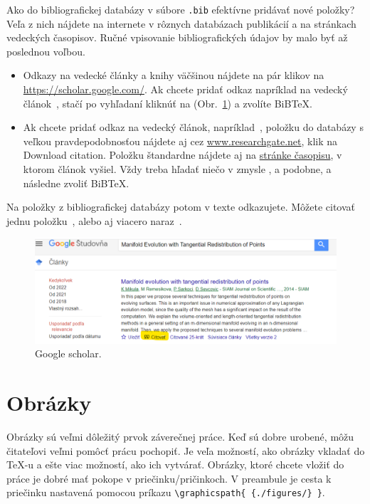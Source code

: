 Ako do bibliografickej databázy v súbore \verb|.bib| efektívne pridávať nové položky? Veľa z nich nájdete na internete v rôznych databázach publikácií a na stránkach vedeckých časopisov. Ručné vpisovanie bibliografických údajov by malo byť až poslednou voľbou.
\begin{itemize}
	\item Odkazy na vedecké články a knihy väčšinou nájdete na pár klikov na \url{https://scholar.google.com/}. Ak chcete pridať odkaz napríklad na vedecký článok~\cite{mikulaRemesikovaSarkoci2014}, stačí po vyhľadaní kliknúť na  (Obr.~\ref{fig:google_scholar}) a zvolíte BiBTeX.
	\item Ak chcete pridať odkaz na vedecký článok, napríklad~\cite{mikulaRemesikovaSarkoci2014}, položku do databázy s veľkou pravdepodobnosťou nájdete aj cez \href{https://www.researchgate.net/publication/275063142_Manifold_Evolution_with_Tangential_Redistribution_of_Points}{www.researchgate.net}, klik na Download citation. Položku štandardne nájdete aj na \href{https://epubs.siam.org/doi/10.1137/130927668}{stránke časopisu}, v ktorom článok vyšiel. Vždy treba hľadať niečo v zmysle ,  a podobne, a následne zvoliť BiBTeX.
\end{itemize}

Na položky z bibliografickej databázy potom v texte odkazujete. Môžete citovať jednu položku~\cite{eymard}, alebo aj viacero naraz~\cite{Handlovicova,mikulaRemesikovaSarkoci2014}.

\begin{figure}[h]
	\centering
	\includegraphics[width=1.0\linewidth]{google_scholar}
	\caption{Google scholar.}
	\label{fig:google_scholar}
\end{figure} 

\section{Obrázky}
Obrázky sú veľmi dôležitý prvok záverečnej práce. Keď sú dobre urobené, môžu čitateľovi veľmi pomôcť prácu pochopiť. Je veľa možností, ako obrázky vkladať do TeX-u a ešte viac možností, ako ich vytvárať. Obrázky, ktoré chcete vložiť do práce je dobré mať pokope v priečinku/pričinkoch. V preambule je cesta k priečinku nastavená pomocou príkazu \verb|\graphicspath{ {./figures/} }|.

